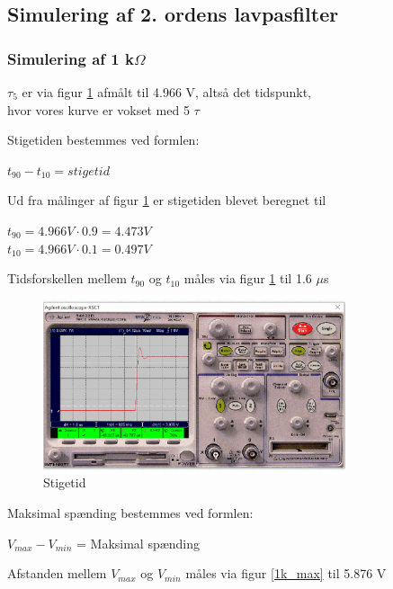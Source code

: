 \subsection{Simulering af 2. ordens lavpasfilter}

\subsubsection{Simulering af 1 k$\Omega$ }
$\tau_5$ er via figur \ref{1k.stigetid} afmålt til 4.966 V, altså det tidspunkt, \\ hvor vores kurve er vokset med 5 $\tau$

Stigetiden bestemmes ved formlen:
\begin{center}
$t_{90} - t_{10} = stigetid$
\end{center}

Ud fra målinger af figur \ref{1k.stigetid} er stigetiden blevet beregnet til

\begin{center}
$t_{90} = 4.966 V \cdot 0.9 = 4.473 V$
\\ 
$t_{10} = 4.966 V \cdot 0.1 = 0.497 V$
\end{center}

Tidsforskellen mellem $t_{90}$ og $t_{10}$ måles via figur \ref{1k.stigetid} til 1.6 $\mu$s

\begin{figure}[h]
 \begin{center}
  \includegraphics[height=5cm]{P_Fig/figur8_1k_stigetid}
  \caption{Stigetid}
  \label{1k.stigetid}
 \end{center}
\end{figure}

Maksimal spænding bestemmes ved formlen:
\begin{center}
$V_{max} - V_{min}$ = Maksimal spænding
\end{center}

Afstanden mellem $V_{max}$ og $V_{min}$ måles via figur \ref{1k_max} til 5.876 V

